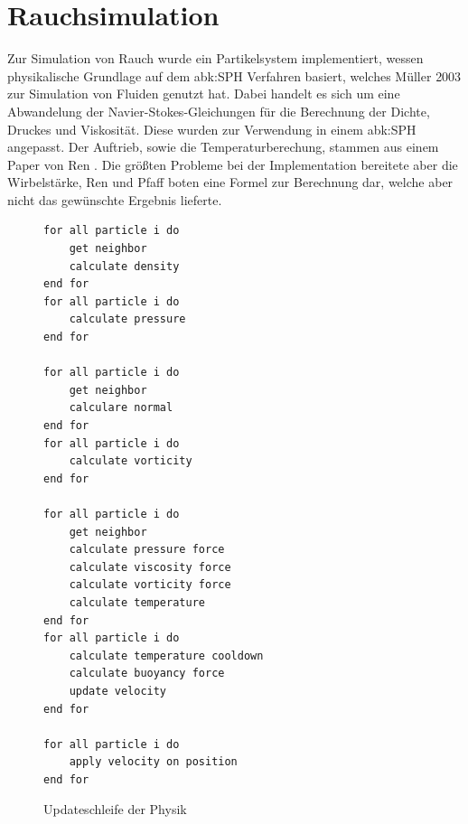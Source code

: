 \documentclass[intern,palatino]{cgBA}
\begin{document}

\section{Rauchsimulation}

Zur Simulation von Rauch wurde ein Partikelsystem implementiert, wessen physikalische Grundlage auf dem \ac{abk:SPH} Verfahren basiert, welches Müller \cite{muller2003particle} 2003 zur Simulation von Fluiden genutzt hat. Dabei handelt es sich um eine Abwandelung der Navier-Stokes-Gleichungen für die Berechnung der Dichte, Druckes und Viskosität. Diese wurden zur Verwendung in einem \ac{abk:SPH} angepasst. Der Auftrieb, sowie die Temperaturberechung, stammen aus einem Paper von Ren \cite{ren2016fast}. Die größten Probleme bei der Implementation bereitete aber die Wirbelstärke, Ren und Pfaff \cite{pfaff2012lagrangian} boten eine Formel zur Berechnung dar, welche aber nicht das gewünschte Ergebnis lieferte.

\begin{figure}
	\begin{lstlisting}
for all particle i do
	get neighbor
	calculate density
end for
for all particle i do
	calculate pressure
end for

for all particle i do
	get neighbor
	calculare normal
end for
for all particle i do
	calculate vorticity
end for

for all particle i do
	get neighbor
	calculate pressure force
	calculate viscosity force
	calculate vorticity force
	calculate temperature
end for
for all particle i do
	calculate temperature cooldown
	calculate buoyancy force
	update velocity
end for

for all particle i do
	apply velocity on position
end for

	\end{lstlisting}
	\caption{Updateschleife der Physik}
	\label{code:test}
\end{figure}
\end{document}
